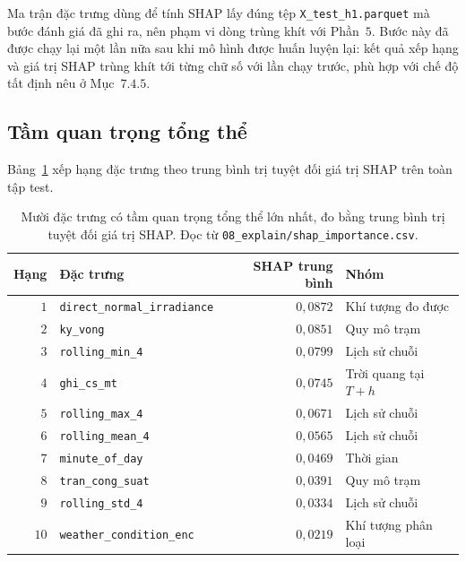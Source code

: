 \documentclass[12pt, a4paper]{report}
\begin{document}
Ma trận đặc trưng dùng để tính SHAP lấy đúng tệp \texttt{X\_test\_h1.parquet} mà bước đánh giá đã
ghi ra, nên phạm vi dòng trùng khít với Phần~$5$. Bước này đã được chạy lại một lần nữa sau khi
mô hình được huấn luyện lại: kết quả xếp hạng và giá trị SHAP trùng khít tới từng chữ số với
lần chạy trước, phù hợp với chế độ tất định nêu ở Mục~$7.4.5$.

\FloatBarrier
\subsection{Tầm quan trọng tổng thể}

Bảng~\ref{tab:shap_global} xếp hạng đặc trưng theo
trung bình trị tuyệt đối giá trị SHAP trên toàn tập test.

\begin{table}[htbp]
\centering
\caption{Mười đặc trưng có tầm quan trọng tổng thể lớn nhất, đo bằng trung bình trị tuyệt đối
giá trị SHAP. Đọc từ \texttt{08\_explain/shap\_importance.csv}.}
\label{tab:shap_global}
\small
\begin{tabular}{r l r l}
\toprule
\textbf{Hạng} & \textbf{Đặc trưng} & \textbf{SHAP trung bình} & \textbf{Nhóm} \\
\midrule
$1$  & \texttt{direct\_normal\_irradiance} & $0{,}0872$ & Khí tượng đo được \\
$2$  & \texttt{ky\_vong}                  & $0{,}0851$ & Quy mô trạm \\
$3$  & \texttt{rolling\_min\_4}            & $0{,}0799$ & Lịch sử chuỗi \\
$4$  & \texttt{ghi\_cs\_mt}                & $0{,}0745$ & Trời quang tại $T{+}h$ \\
$5$  & \texttt{rolling\_max\_4}            & $0{,}0671$ & Lịch sử chuỗi \\
$6$  & \texttt{rolling\_mean\_4}           & $0{,}0565$ & Lịch sử chuỗi \\
$7$  & \texttt{minute\_of\_day}            & $0{,}0469$ & Thời gian \\
$8$  & \texttt{tran\_cong\_suat}           & $0{,}0391$ & Quy mô trạm \\
$9$  & \texttt{rolling\_std\_4}            & $0{,}0334$ & Lịch sử chuỗi \\
$10$ & \texttt{weather\_condition\_enc}    & $0{,}0219$ & Khí tượng phân loại \\
\bottomrule
\end{tabular}
\caption[Mười đặc trưng có tầm quan trọng tổng thể lớn nhất, đo bằng trung bình trị tuyệt đối giá trị]{Mười đặc trưng có tầm quan trọng tổng thể lớn nhất, đo bằng trung bình trị tuyệt đối
giá trị SHAP. Đọc từ \texttt{08\_explain/shap\_importance.csv}.}
\label{tab:shap_global}
\end{table}
\end{document}
